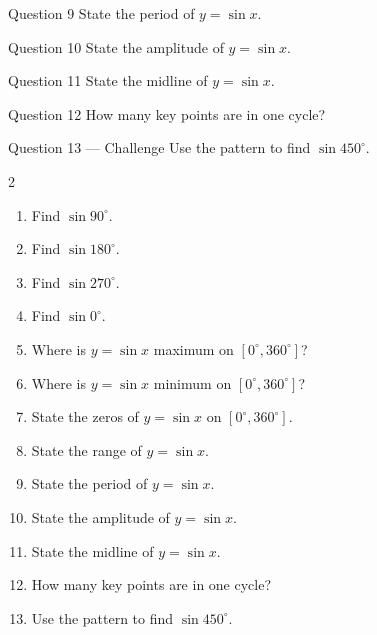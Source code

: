 \documentclass[11pt]{article}
\begin{document}
\begin{qbox}{Question 9}
State the period of $y=\sin x$.\workspace{2.4cm}
\end{qbox}

\begin{qbox}{Question 10}
State the amplitude of $y=\sin x$.\workspace{2.4cm}
\end{qbox}

\begin{qbox}{Question 11}
State the midline of $y=\sin x$.\workspace{2.4cm}
\end{qbox}

\begin{qbox}{Question 12}
How many key points are in one cycle?\workspace{2.4cm}
\end{qbox}

\begin{qbox}{Question 13 --- Challenge}
Use the pattern to find $\sin450^\circ$.\workspace{2.6cm}
\end{qbox}

\clearpage
{}

\begin{recapbox}
\begin{multicols}{2}
\small
\begin{enumerate}[leftmargin=*,itemsep=3pt]
  \item Find $\sin90^\circ$.
  \item Find $\sin180^\circ$.
  \item Find $\sin270^\circ$.
  \item Find $\sin0^\circ$.
  \item Where is $y=\sin x$ maximum on $[0^\circ,360^\circ]$?
  \item Where is $y=\sin x$ minimum on $[0^\circ,360^\circ]$?
  \item State the zeros of $y=\sin x$ on $[0^\circ,360^\circ]$.
  \item State the range of $y=\sin x$.
  \item State the period of $y=\sin x$.
  \item State the amplitude of $y=\sin x$.
  \item State the midline of $y=\sin x$.
  \item How many key points are in one cycle?
  \item Use the pattern to find $\sin450^\circ$.
\end{enumerate}
\end{multicols}
\end{recapbox}
\end{document}
